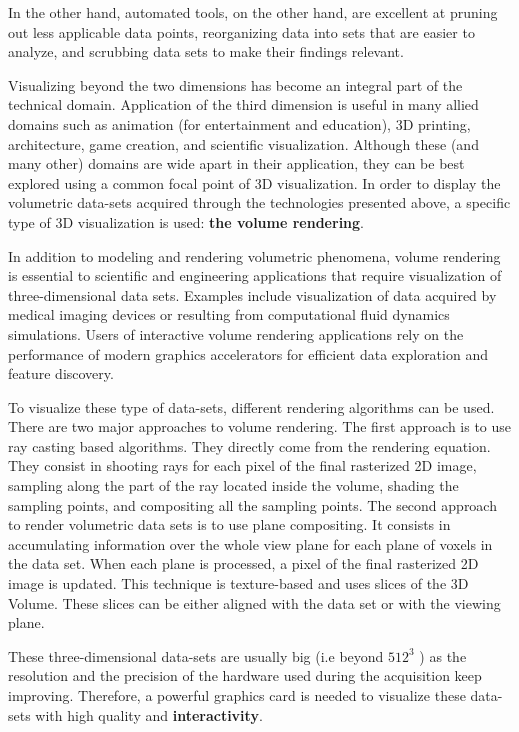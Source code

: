 In the other hand, automated tools, on the other hand, are excellent at pruning out less applicable data points, reorganizing data into sets that are easier to analyze, and scrubbing data sets to make their findings relevant.


Visualizing beyond the two dimensions has become an integral part of the technical domain. Application of the third dimension is useful in many allied domains such as animation (for entertainment and education), 3D printing, architecture, game creation, and scientific visualization. Although these (and many other) domains are wide apart in their application, they can be best explored using a common focal point of 3D visualization. In order to display the volumetric data-sets acquired through the technologies presented above, a specific type of 3D visualization is used:  \textbf{the volume rendering}.



In addition to modeling and rendering volumetric phenomena, volume rendering is essential to scientific and engineering applications that require visualization of three-dimensional data sets. Examples include visualization of data acquired by medical imaging devices or resulting from computational fluid dynamics simulations. Users of interactive volume rendering applications rely on the performance of modern graphics accelerators for efficient data exploration and feature discovery.


To visualize these type of data-sets, different rendering algorithms can be used. There are two major approaches to volume rendering. The first approach is to use ray casting based algorithms. They directly come from the rendering equation. They consist in shooting rays for each pixel of the final rasterized 2D image, sampling along the part of the ray located inside the volume, shading the sampling points, and compositing all the sampling points.   
The second approach to render volumetric data sets is to use plane compositing. It consists in accumulating information over the whole view plane for each plane of voxels in the data set. When each plane is processed, a pixel of the final rasterized 2D image is updated. This technique is texture-based and uses slices of the 3D Volume. These slices can be either aligned with the data set or with the viewing plane.


These three-dimensional data-sets are usually big (i.e beyond $512^{3}$ ) as the resolution and the precision of the hardware used during the acquisition keep improving. Therefore, a powerful graphics card is needed to visualize these data-sets with high quality and \textbf{interactivity}. 

